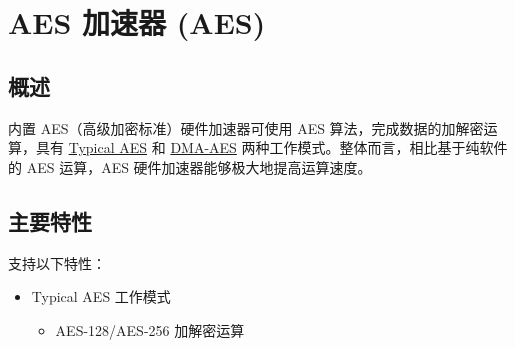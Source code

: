 \documentclass[main\_\_CN.tex]{subfiles}
\begin{document}
\setchineseformatting


\ifglobal
\else
    \clearpage
    \listoftodos
    \listofdonetodos
    \tableofcontents
\fi



\hypertarget{aes}{}
\chapter{AES 加速器 (AES)}\label{mod:aes}

\section{概述}

\chipname{} 内置 AES（高级加密标准）硬件加速器可使用 AES 算法，完成数据的加解密运算，具有 \hyperref[sec:aes-typical-modes]{Typical AES} 和 \hyperref[sec:aes-dma-aes]{DMA-AES} 两种工作模式。整体而言，相比基于纯软件的 AES 运算，AES 硬件加速器能够极大地提高运算速度。

\section{主要特性}

\chipname{} 支持以下特性：
\begin{itemize}
    \item Typical AES 工作模式
        \begin{itemize}
            \item AES-128/AES-256 加解密运算
        \end{itemize}
    \end{itemize}
\end{document}
